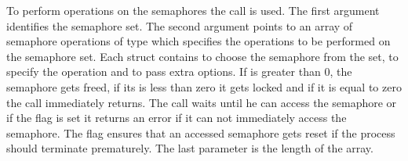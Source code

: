 To perform operations on the semaphores the  call is used.
The first argument  identifies the semaphore set.
The second argument  points to an array of semaphore operations of type  which specifies the operations to be performed on the semaphore set.
Each  struct contains  to choose the semaphore  from the set,  to specify the operation and  to pass extra options.
If  is greater than 0, the semaphore gets freed, if its is less than zero it gets locked and if it is equal to zero the call immediately returns. 
The call waits until he can access the semaphore or if the flag  is set it returns an error if it can not immediately access the semaphore.  
The flag  ensures that an accessed semaphore gets reset if the process should terminate prematurely. 
The last parameter  is the length of the  array\cite{unix-programming}.